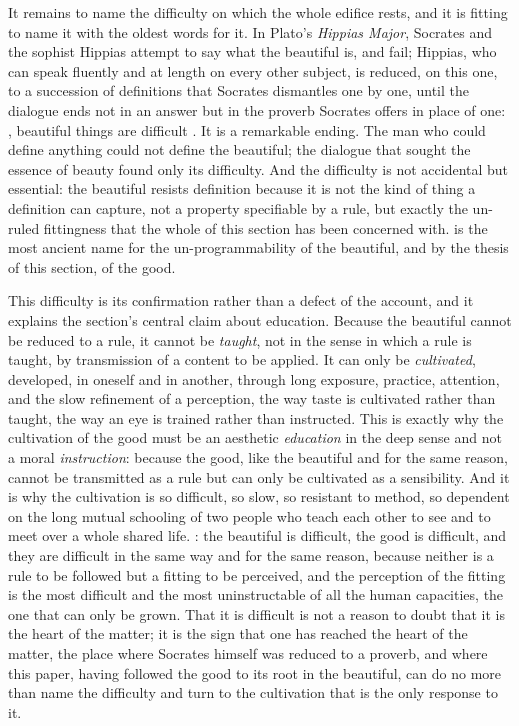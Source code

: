 It remains to name the difficulty on which the whole edifice rests, and it is fitting to name it with the oldest words for it. In Plato's \emph{Hippias Major}, Socrates and the sophist Hippias attempt to say what the beautiful is, and fail; Hippias, who can speak fluently and at length on every other subject, is reduced, on this one, to a succession of definitions that Socrates dismantles one by one, until the dialogue ends not in an answer but in the proverb Socrates offers in place of one: , beautiful things are difficult \parencite{plato1926}. It is a remarkable ending. The man who could define anything could not define the beautiful; the dialogue that sought the essence of beauty found only its difficulty. And the difficulty is not accidental but essential: the beautiful resists definition because it is not the kind of thing a definition can capture, not a property specifiable by a rule, but exactly the un-ruled fittingness that the whole of this section has been concerned with.  is the most ancient name for the un-programmability of the beautiful, and by the thesis of this section, of the good.

This difficulty is its confirmation rather than a defect of the account, and it explains the section's central claim about education. Because the beautiful cannot be reduced to a rule, it cannot be \emph{taught}, not in the sense in which a rule is taught, by transmission of a content to be applied. It can only be \emph{cultivated}, developed, in oneself and in another, through long exposure, practice, attention, and the slow refinement of a perception, the way taste is cultivated rather than taught, the way an eye is trained rather than instructed. This is exactly why the cultivation of the good must be an aesthetic \emph{education} in the deep sense and not a moral \emph{instruction}: because the good, like the beautiful and for the same reason, cannot be transmitted as a rule but can only be cultivated as a sensibility. And it is why the cultivation is so difficult, so slow, so resistant to method, so dependent on the long mutual schooling of two people who teach each other to see and to meet over a whole shared life. : the beautiful is difficult, the good is difficult, and they are difficult in the same way and for the same reason, because neither is a rule to be followed but a fitting to be perceived, and the perception of the fitting is the most difficult and the most uninstructable of all the human capacities, the one that can only be grown. That it is difficult is not a reason to doubt that it is the heart of the matter; it is the sign that one has reached the heart of the matter, the place where Socrates himself was reduced to a proverb, and where this paper, having followed the good to its root in the beautiful, can do no more than name the difficulty and turn to the cultivation that is the only response to it.
